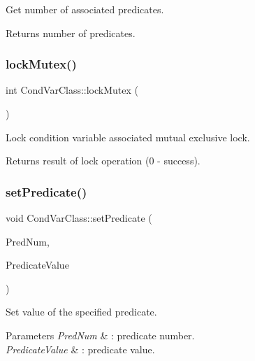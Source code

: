 Get number of associated predicates. \begin{DoxyReturn}{Returns}
number of predicates. 
\end{DoxyReturn}
\mbox{\label{classCondVarClass_a23809969d99080860b737fca1a5167af}} 
\subsubsection{\texorpdfstring{lock\+Mutex()}{lockMutex()}}
{\footnotesize\ttfamily int Cond\+Var\+Class\+::lock\+Mutex (\begin{DoxyParamCaption}{ }\end{DoxyParamCaption})\hspace{0.3cm}{\ttfamily [inline]}}

Lock condition variable associated mutual exclusive lock. \begin{DoxyReturn}{Returns}
result of lock operation (0 -\/ success). 
\end{DoxyReturn}
\mbox{\label{classCondVarClass_a6858cc038d21b6ab4432f2259a1e0a08}} 
\subsubsection{\texorpdfstring{set\+Predicate()}{setPredicate()}}
{\footnotesize\ttfamily void Cond\+Var\+Class\+::set\+Predicate (\begin{DoxyParamCaption}\item[{\hyperlink{classCondVarClass_a8e27f99972b8b95f064d6657a4583a5b}{Predicate\+Id\+Type}}]{Pred\+Num,  }\item[{bool}]{Predicate\+Value }\end{DoxyParamCaption})\hspace{0.3cm}{\ttfamily [noexcept]}}

Set value of the specified predicate. 
\begin{DoxyParams}{Parameters}
{\em Pred\+Num} & \+: predicate number. \\
\hline
{\em Predicate\+Value} & \+: predicate value. \\
\hline
\end{DoxyParams}

